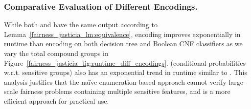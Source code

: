 \subsubsection{Comparative Evaluation of Different Encodings.}
While both {\justiciaenum} and {\justicialearn}  have the same output according to Lemma~\ref{fairness_justicia_lm:equivalence},  {\justicialearn} encoding  improves exponentially  in runtime  than {\justiciaenum} encoding on both decision tree and Boolean CNF classifiers as we vary the total compound groups in Figure~\ref{fairness_justicia_fig:runtime_diff_encodings}. {\justiciacond} (conditional probabilities w.r.t. sensitive groups) also has an exponential trend in runtime similar to {\justiciaenum}.  This analysis justifies that the na\"ive enumeration-based approach cannot verify large-scale fairness problems containing multiple sensitive features, and {\justicialearn} is a more efficient approach for practical use.









